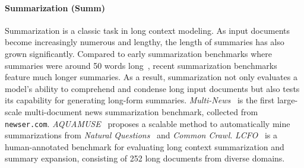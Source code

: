 \documentclass[11pt, a4paper, logo, copyright, nonumbering]{map}
\begin{document}
\paragraph{Summarization (Summ)} Summarization is a classic task in long context modeling. As input documents become increasingly numerous and lengthy, the length of summaries has also grown significantly. Compared to early summarization benchmarks where summaries were around 50 words long~\citep{nallapati2016abstractive}, recent summarization benchmarks feature much longer summaries. As a result, summarization not only evaluates a model's ability to comprehend and condense long input documents but also tests its capability for generating long-form summaries. \textit{Multi-News}~\citep{fabbri2019multi} is the first large-scale multi-document news summarization benchmark, collected from \texttt{newser.com}. \textit{AQUAMUSE}~\citep{kulkarni2020aquamuse} proposes a scalable method to automatically mine summarizations from \textit{Natural Questions}~\citep{kwiatkowski2019natural} and \textit{Common Crawl}. \textit{LCFO}~\citep{costa2024lcfo} is a human-annotated benchmark for evaluating long context summarization and summary expansion, consisting of 252 long documents from diverse domains.
\end{document}
